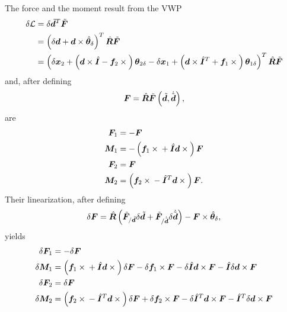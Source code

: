 \documentclass[10pt,dvips,fleqn,subeqn]{report}
\newcommand{\T}[1]{\bm{#1}}
\begin{document}
The force and the moment result from the VWP
\begin{align}
	\delta\mathcal{L}
	&= \delta \tilde{\T{d}}^T \tilde{\T{F}} \nonumber \\
	&= \plbr{
		\delta\T{d}
		+ \T{d} \times \hat{\T{\theta}}_{\delta}
	}^T \hat{\T{R}} \tilde{\T{F}} \nonumber \\
	&= \plbr{
		\delta\T{x}_2
		+ \plbr{
			\T{d}\times\hat{\T{I}}
			- \T{f}_2\times{}
		} \T{\theta}_{2\delta}
		- \delta\T{x}_1
		+ \plbr{
			\T{d}\times\hat{\T{I}}^T
			+ \T{f}_1\times{}
		} \T{\theta}_{1\delta}
	}^T \hat{\T{R}} \tilde{\T{F}}
\end{align}
and, after defining
\begin{equation}
	\T{F} = \hat{\T{R}}
		\tilde{\T{F}}\plbr{\tilde{\T{d}}, \dot{\tilde{\T{d}}}} ,
\end{equation}
 are
\begin{subequations}
\begin{align}
	\T{F}_1 &= - \T{F} \\
	\T{M}_1 &= - \plbr{
		\T{f}_1 \times{}
		+ \hat{\T{I}} \T{d}\times{}
	} \T{F} \\
	\T{F}_2 &= \T{F} \\
	\T{M}_2 &= \plbr{
		\T{f}_2 \times{}
		- \hat{\T{I}}^T \T{d}\times{}
	} \T{F} .
\end{align}
\end{subequations}
Their linearization, after defining
\begin{equation}
	\delta\T{F} = \hat{\T{R}} \plbr{
		\tilde{\T{F}}_{/\tilde{\T{d}}} \delta{\tilde{\T{d}}}
		+ \tilde{\T{F}}_{/\dot{\tilde{\T{d}}}} \delta\dot{\tilde{\T{d}}}
	} - \T{F} \times \hat{\T{\theta}}_{\delta} ,
\end{equation}
yields
\begin{subequations}
\begin{align}
	\delta\T{F}_1 &= - \delta\T{F} \\
	\delta\T{M}_1 &= \plbr{
		\T{f}_1 \times{}
		+ \hat{\T{I}} \T{d}\times{}
	} \delta\T{F}
	- \delta\T{f}_1 \times \T{F}
	- \delta\hat{\T{I}} \T{d} \times \T{F}
	- \hat{\T{I}} \delta\T{d} \times \T{F} \\
	\delta\T{F}_2 &= \delta\T{F} \\
	\delta\T{M}_2 &= \plbr{
		\T{f}_2 \times{}
		- \hat{\T{I}}^T \T{d} \times{}
	} \delta\T{F}
	+ \delta\T{f}_2 \times \T{F}
	- \delta\hat{\T{I}}^T \T{d} \times \T{F}
	- \hat{\T{I}}^T \delta\T{d} \times \T{F}
\end{align}
\end{subequations}
\end{document}
